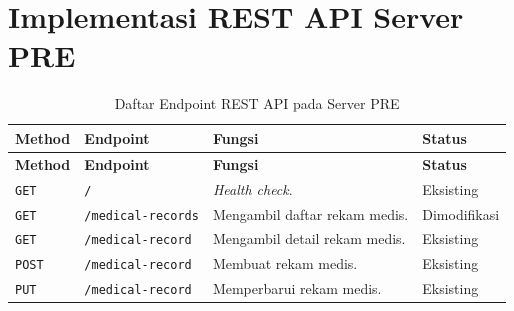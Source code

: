 \chapter{Implementasi REST API Server PRE}
\label{lampiran:implementasi-rest-api-pre}

{\small
	\begin{longtable}{|p{}|p{}|p{}|p{}|}
		\caption{Daftar Endpoint REST API pada Server PRE}
		\label{tab:daftar-endpoint-rest-api-pre}                                                                         \\
		\hline
		\textbf{Method} & \textbf{Endpoint}                                          & \textbf{Fungsi} & \textbf{Status} \\ \hline
		\endfirsthead

		\hline
		\textbf{Method} & \textbf{Endpoint}                                          & \textbf{Fungsi} & \textbf{Status} \\ \hline
		\endhead

		\texttt{GET}    & \texttt{/}
		                & \textit{Health check}.
		                & Eksisting                                                                                      \\ \hline

		\texttt{GET}    & \texttt{/medical-\allowbreak records}
		                & Mengambil daftar rekam medis.
		                & Dimodifikasi                                                                                   \\ \hline

		\texttt{GET}    & \texttt{/medical-\allowbreak record}
		                & Mengambil detail rekam medis.
		                & Eksisting                                                                                      \\ \hline

		\texttt{POST}   & \texttt{/medical-\allowbreak record}
		                & Membuat rekam medis.
		                & Eksisting                                                                                      \\ \hline

		\texttt{PUT}    & \texttt{/medical-\allowbreak record}
		                & Memperbarui rekam medis.
		                & Eksisting                                                                                      \\ \hline


\end{longtable}}
